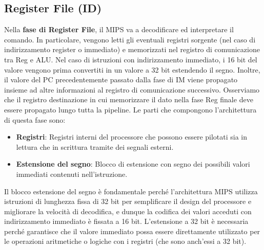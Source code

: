 \subsection{Register File (ID)}
Nella \textbf{fase di Register File}, il MIPS va a decodificare ed interpretare il comando. In particolare, vengono letti gli eventuali registri sorgente (nel caso di indirizzamento register o immediato) e memorizzati nel registro di comunicazione tra Reg e ALU. Nel caso di istruzioni con indirizzamento immediato, i 16 bit del valore vengono prima convertiti in un valore a 32 bit estendendo il segno. Inoltre, il valore del PC precedentemente passato dalla fase di IM viene propagato insieme ad altre informazioni al registro di comunicazione successivo. Osserviamo che il registro destinazione in cui memorizzare il dato nella fase Reg finale deve essere propagato lungo tutta la pipeline.
Le parti che compongono l'architettura di questa fase sono:
\begin{itemize}
    \item \textbf{Registri}: Registri interni del processore che possono essere pilotati sia in lettura che in scrittura tramite dei segnali esterni.
    \item \textbf{Estensione del segno}: Blocco di estensione con segno dei possibili valori immediati contenuti nell'istruzione.
\end{itemize}
Il blocco estensione del segno è fondamentale perché l'architettura MIPS utilizza istruzioni di lunghezza fissa di 32 bit per semplificare il design del processore e migliorare la velocità di decodifica, e dunque la codifica dei valori acceduti con indirizzamento immediato è fissata a 16 bit. L'estensione a 32 bit è necessaria perché garantisce che il valore immediato possa essere direttamente utilizzato per le operazioni aritmetiche o logiche con i registri (che sono anch'essi a 32 bit).

